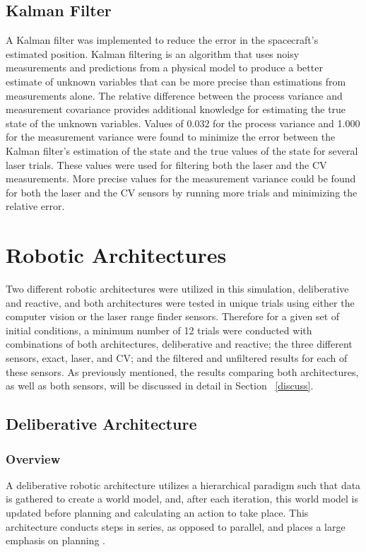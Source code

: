 \documentclass[journal, 10pt]{IEEEtran}
\begin{document}
\subsection{Kalman Filter}
A Kalman filter was implemented to reduce the error in the spacecraft's estimated position. Kalman filtering is an algorithm that uses noisy measurements and predictions from a physical model to produce a better estimate of unknown variables that can be more precise than estimations from measurements alone. The relative difference between the process variance and measurement covariance provides additional knowledge for estimating the true state of the unknown variables. Values of 0.032 for the process variance and 1.000 for the measurement variance were found to minimize the error between the Kalman filter's estimation of the state and the true values of the state for several laser trials. These values were used for filtering both the laser and the CV measurements. More precise values for the measurement variance could be found for both the laser and the CV sensors by running more trials and minimizing the relative error.

\section{Robotic Architectures}
Two different robotic architectures were utilized in this simulation, deliberative and reactive, and both architectures were tested in unique trials using either the computer vision or the laser range finder sensors. Therefore for a given set of initial conditions, a minimum number of 12 trials were conducted with combinations of both architectures, deliberative and reactive; the three different sensors, exact, laser, and CV; and the filtered and unfiltered results for each of these sensors. As previously mentioned, the results comparing both architectures, as well as both sensors, will be discussed in detail in Section ~\ref{discuss}.

\subsection{Deliberative Architecture}
\subsubsection{Overview}
A deliberative robotic architecture utilizes a hierarchical paradigm such that data is gathered to create a world model, and, after each iteration, this world model is updated before planning and calculating an action to take place. This architecture conducts steps in series, as opposed to parallel, and places a large emphasis on planning \cite{joshi}.
\end{document}

